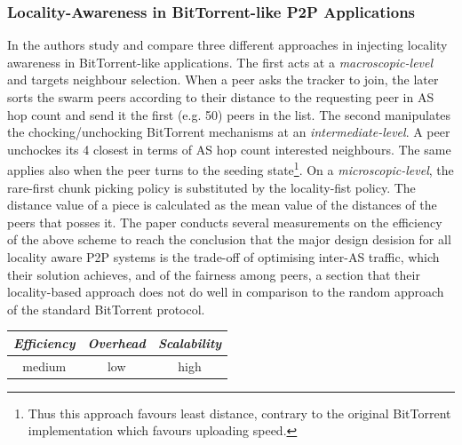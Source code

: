 \subsubsection{Locality-Awareness in BitTorrent-like P2P Applications}
In \cite{lclx_bitlocal_2009} the authors study and compare three different
approaches in injecting locality awareness in BitTorrent-like applications. The
first acts at a \emph{macroscopic-level} and targets neighbour selection. When a
peer asks the tracker to join, the later sorts the swarm peers according to
their distance to the requesting peer in AS hop count and send it the first
(e.g. 50) peers in the list. The second manipulates the chocking/unchocking
BitTorrent mechanisms at an \emph{intermediate-level}. A peer unchockes its 4
closest in terms of AS hop count interested neighbours. The same applies also
when the peer turns to the seeding state\footnote{Thus this approach favours
least distance, contrary to the original BitTorrent implementation which favours
uploading speed.}. On a \emph{microscopic-level}, the rare-first chunk picking
policy is substituted by the locality-fist policy. The distance value of a piece
is calculated as the mean value of the distances of the peers that posses it.
The paper conducts several measurements on the efficiency of the above scheme to
reach the conclusion that the major design desision for all locality aware P2P
systems is the trade-off of optimising inter-AS traffic, which their solution
achieves, and of the fairness among peers, a section that their locality-based
approach does not do well in comparison to the random approach of the standard
BitTorrent protocol.

\begin{center}
\begin{tabular}{ccc}
\emph{Efficiency} & \emph{Overhead} & \emph{Scalability} \\
\hline
medium &
low &
%
high
\end{tabular}
\end{center}

